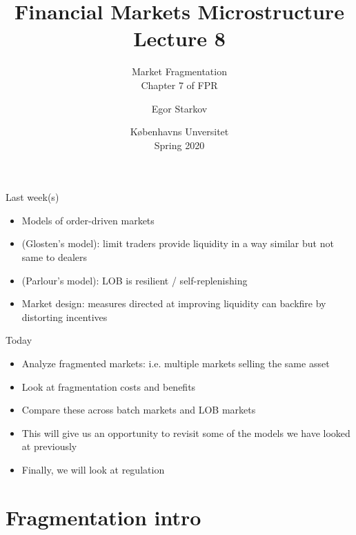 \documentclass[english,10pt
,aspectratio=169
]{beamer}
\title{Financial Markets Microstructure \\ Lecture 8}
\subtitle{Market Fragmentation\\
	Chapter 7 of FPR}
\author{Egor Starkov}
\date{K{\o}benhavns Unversitet \\
	Spring 2020}
\begin{document}
\frame[plain]{\titlepage}


\begin{frame}{Last week(s)}
	\begin{itemize}
		\item Models of order-driven markets
		\item (Glosten's model): limit traders provide liquidity in a way similar but not same to dealers
		\item (Parlour's model): LOB is resilient / self-replenishing
		\item Market design: measures directed at improving liquidity can backfire by distorting incentives
	\end{itemize}
\end{frame}


\begin{frame}{Today}
	\begin{itemize}
		\item Analyze fragmented markets: i.e. multiple markets selling the same asset
		\item Look at fragmentation costs and benefits
		\item Compare these across batch markets and LOB markets
		\item This will give us an opportunity to revisit some of the models we have looked at previously
		\item Finally, we will look at regulation
	\end{itemize}
\end{frame}



\section{Fragmentation intro}
\end{document}
